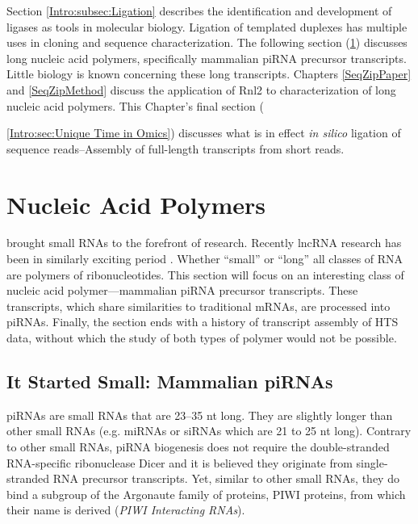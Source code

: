     Section \ref{Intro:subsec:Ligation} describes the identification and development of ligases as tools in molecular biology. Ligation of templated duplexes has multiple uses in cloning and sequence characterization. The following section (\ref{Intro:sec:Nucleic Acid Polymers}) discusses long nucleic acid polymers, specifically mammalian piRNA precursor transcripts. Little biology is known concerning these long transcripts. Chapters \ref{SeqZipPaper} and \ref{SeqZipMethod} discuss the application of Rnl2 to characterization of long nucleic acid polymers. This Chapter's final section ({\ref{Intro:sec:Unique Time in Omics}) discusses what is in effect \textit{in silico} ligation of sequence reads--Assembly of full-length transcripts from short reads.

\section{Nucleic Acid Polymers}
  \label{Intro:sec:Nucleic Acid Polymers}

  \citet{Fire1998} brought small RNAs to the forefront of research. Recently lncRNA research has been in similarly exciting period \citep{Khalil2009,Guttman2009}. Whether ``small'' or ``long'' all classes of RNA are polymers of ribonucleotides. This section will focus on an interesting class of nucleic acid polymer---mammalian piRNA precursor transcripts. These transcripts, which share similarities to traditional mRNAs, are processed into piRNAs. Finally, the section ends with a history of transcript assembly of HTS data, without which the study of both types of polymer would not be possible.

  \subsection{It Started Small: Mammalian piRNAs}
  
    piRNAs are small RNAs that are 23--35 nt long. They are slightly longer than other small RNAs (e.g. miRNAs or siRNAs which are 21 to 25 nt long). Contrary to other small RNAs, piRNA biogenesis does not require the double-stranded RNA-specific ribonuclease Dicer \citep{Vagin2006, Houwing2007} and it is believed they originate from single-stranded RNA precursor transcripts. Yet, similar to other small RNAs, they do bind a subgroup of the Argonaute family of proteins, PIWI proteins, from which their name is derived (\textit{PIWI Interacting RNAs}). 

}

